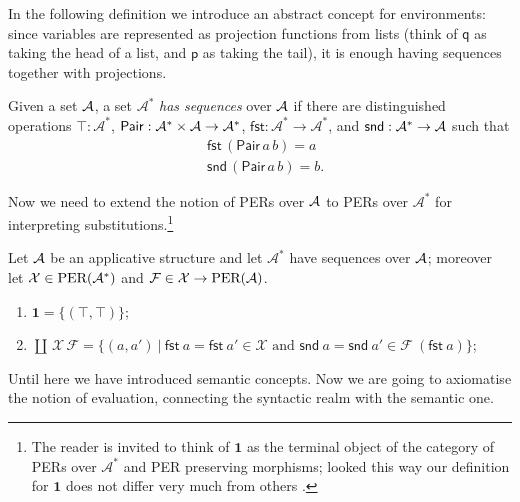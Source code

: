 \documentclass{LMCS}
\theoremstyle{plain}\newtheorem{satz}[thm]{Satz}
\newcommand{\A}{\mathcal{A}}
\newcommand{\seq}[1]{#1^*}
\newcommand{\Aseq}{\seq\A}
\newcommand{\tfst}{\mathsf{fst}}
\newcommand{\tsnd}{\mathsf{snd}}
\newcommand{\tPair}{\mathsf{Pair}}
\newcommand{\into}{\rightarrow}
\newcommand{\p}{\mathsf{p}}
\newcommand{\q}{\mathsf{q}}
\newcommand{\calX}{\mathcal{X}}
\newcommand{\calF}{\mathcal{F}}
\newcommand{\sigD}[2]{\coprod\,#1\,#2}
\newcommand{\one}{\mathbf{1}}
\newcommand{\iO}{\top}
\begin{document}
{In the following definition we introduce an abstract concept for
environments: since variables are represented as projection functions
from lists (think of $\q$ as taking the head of a list, and $\p$ as
taking the tail), it is enough having sequences together with
projections.

\begin{defi}[Sequences]
  Given a set $\mathcal{A}$, a set $\Aseq$ \emph{has sequences} over $\mathcal{A}$ if
  there are distinguished operations $\iO : \Aseq$, $\tPair : \Aseq
  \times \calA \to \Aseq$, $\tfst : \Aseq \to \Aseq$,  and $\tsnd : \Aseq
  \to \calA$ such that
  \begin{eqnarray*}
    &\tfst\, (\tPair\, a\, b)= a \\
    &\tsnd\, (\tPair\, a\, b)= b .
  \end{eqnarray*}
\end{defi}

Now we need to extend the notion of PERs over $\mathcal{A}$ to PERs over
$\Aseq$ for interpreting substitutions.\footnote{The reader is invited
  to think of $\one$ as the terminal object of the category of PERs
  over $\Aseq$ and PER preserving morphisms; looked this way our
  definition for $\one$ does not differ very much from others
  \cite{aspinall:csl94,coquandPollackTakeyama:fundinf05}.} 

\begin{defi} Let $\mathcal{A}$ be an applicative structure and let $\Aseq$
  have sequences over $\mathcal{A}$; moreover let $\calX\in\per{\Aseq}$ and $\calF\in \calX\into
  \per{\calA}$.
  \begin{enumerate}[(1)]
   \item $\one = \{(\iO,\iO)\}$;
   \item $\sigD{\calX}{\calF} = \{(a,a')\ |\ \tfst\ a = \tfst\ a' \in \calX \mbox{ and }
     \tsnd\ a = \tsnd\ a' \in \calF\ (\tfst\ a)\}$;
  \end{enumerate}
\end{defi}

Until here we have introduced semantic concepts. Now we are going to
axiomatise the notion of evaluation, connecting the syntactic realm
with the semantic one.

}
\end{document}
